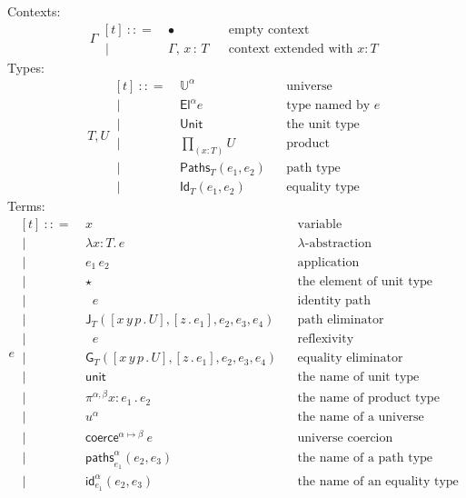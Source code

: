 \documentclass{article}
\newcommand{\G}{\Gamma} %
\newcommand{\T}{T} %
\newcommand{\U}{U} %
\newcommand{\x}{x} %
\newcommand{\e}{e} %
\newcommand{\bnf}{\ \mathrel{{:}{:}{=}}\ }
\newcommand{\bnfor}{\ \mid\ \ }
\newcommand{\ctxempty}{\bullet} %
\newcommand{\ctxextend}[3]{#1,\, #2\, {:}\, #3} %
\newcommand{\Universe}[1]{\mathbb{U}^{#1}} %
\newcommand{\El}[2]{\mathsf{El}^{#1} #2} %
\newcommand{\Unit}{\mathsf{Unit}} %
\newcommand{\Prod}[2]{{\textstyle\prod_{(#1 {:} #2)}}} %
\newcommand{\lam}[2]{\lambda #1 {:} #2 .\,} %
\newcommand{\app}[2]{#1\,#2} %
\newcommand{\abst}[2]{[#1 \,.\, #2]} %
\newcommand{\unitTerm}{\star} %
\newcommand{\coerce}[3]{\mathsf{coerce}^{#2{\mapsto}#3}\ #1}
\newcommand{\PrEqual}[3]{\mathsf{Paths}_{#1}(#2,#3)} %
\newcommand{\JuEqual}[3]{\mathsf{Id}_{#1}(#2,#3)} %
\newcommand{\PrElim}[6]{\mathsf{J}_{#1}(#2, #3, #4, #5, #6)} %
\newcommand{\JuElim}[6]{\mathsf{G}_{#1}(#2, #3, #4, #5, #6)} %
\newcommand{\prRefl}[1]{\mathop{\mathsf{idpath}_{#1}}}  %
\newcommand{\juRefl}[1]{\mathop{\mathsf{refl}_{#1}}}    %
\newcommand{\nUnit}{\mathsf{unit}} %
\newcommand{\nProd}[3]{\pi^{#1} #2 {:} #3 \,.\,} %
\newcommand{\nUniverse}[1]{u^{#1}}  %
\newcommand{\nPrEqual}[4]{\mathsf{paths}^{#1}_{#2}(#3,#4)} %
\newcommand{\nJuEqual}[4]{\mathsf{id}^{#1}_{#2}(#3,#4)} %
\begin{document}
Contexts:
%
\begin{equation*}
  \G
  \begin{aligned}[t]
    \bnf   {}& \ctxempty & & \text{empty context}\\
    \bnfor {}& \ctxextend{\G}{\x}{\T} & & \text{context extended with $x : T$}
  \end{aligned}
\end{equation*}
%
Types:
%
\begin{equation*}
  \T, \U
  \begin{aligned}[t]
    \bnf   {}& \Universe{\alpha} & & \text{universe}\\
    \bnfor {}& \El{\alpha}{\e} & & \text{type named by $e$}\\
    \bnfor {}& \Unit & & \text{the unit type}\\
    \bnfor {}& \Prod{x}{\T} \U & & \text{product}\\
    \bnfor {}& \PrEqual{T}{\e_1}{\e_2} & & \text{path type}\\
    \bnfor {}& \JuEqual{T}{\e_1}{\e_2} & & \text{equality type}
  \end{aligned}
\end{equation*}
%
Terms:
%
\begin{equation*}
  \e
  \begin{aligned}[t]
    \bnf   {}&  \x   &&\text{variable} \\
    \bnfor {}&  \lam{\x}{\T} \e  &&\text{$\lambda$-abstraction} \\
    \bnfor {}&   \app{\e_1}{\e_2}  &&\text{application} \\
    \bnfor {}&  \unitTerm  &&\text{the element of unit type} \\
    \bnfor {}&  \prRefl{\T}{\e}  &&\text{identity path} \\
    \bnfor {}&  \PrElim{\T}{\abst{x\,y\,p}{\U}}{\abst{z}{\e_1}}{\e_2}{\e_3}{\e_4}  &&\text{path eliminator} \\
    \bnfor {}&  \juRefl{\T}{\e}  &&\text{reflexivity} \\
    \bnfor {}&  \JuElim{\T}{\abst{x\,y\,p}{\U}}{\abst{z}{\e_1}}{\e_2}{\e_3}{\e_4}  &&\text{equality eliminator} \\
    \bnfor {}&  \nUnit  &&\text{the name of unit type} \\
    \bnfor {}&  \nProd{\alpha,\beta}{\x}{\e_1} \e_2  &&\text{the name of product type} \\
    \bnfor {}&  \nUniverse{\alpha} &&\text{the name of a universe} \\
    \bnfor {}&  \coerce{\e}{\alpha}{\beta}  &&\text{universe coercion} \\
    \bnfor {}&  \nPrEqual{\alpha}{\e_1}{\e_2}{\e_3}  &&\text{the name of a path type} \\
    \bnfor {}&  \nJuEqual{\alpha}{\e_1}{\e_2}{\e_3}  &&\text{the name of an equality type}
  \end{aligned}
\end{equation*}
\end{document}
